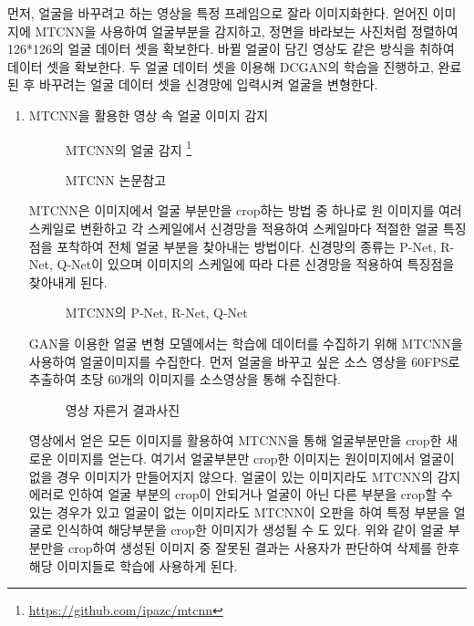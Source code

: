 \documentclass{oblivoir}
\begin{document}
먼저, 얼굴을 바꾸려고 하는 영상을 특정 프레임으로 잘라 이미지화한다. 얻어진 이미지에 MTCNN을 사용하여 얼굴부분을 감지하고,  정면을 바라보는 사진처럼 정렬하여 126*126의 얼굴 데이터 셋을 확보한다. 바뀔 얼굴이 담긴 영상도 같은 방식을 취하여 데이터 셋을 확보한다. 두 얼굴 데이터 셋을 이용해 DCGAN의 학습을 진행하고, 완료된 후 바꾸려는 얼굴 데이터 셋을 신경망에 입력시켜 얼굴을 변형한다.
\begin{enumerate}
    
    \item MTCNN을 활용한 영상 속 얼굴 이미지 감지


    \begin{figure}[h!]
    \centering
    \caption{MTCNN의 얼굴 감지 \protect\footnote{\protect\url {https://github.com/ipazc/mtcnn}}}
    \end{figure}

    \begin{figure}[h!]
    \centering
    \caption{MTCNN 논문참고}
    \end{figure}



    MTCNN은 이미지에서 얼굴 부분만을 crop하는 방법 중 하나로 원 이미지를 여러 스케일로 변환하고 각 스케일에서 신경망을 적용하여 스케일마다 적절한 얼굴 특징점을 포착하여 전체 얼굴 부분을 찾아내는 방법이다. 신경망의 종류는 P-Net, R-Net, Q-Net이 있으며 이미지의 스케일에 따라 다른 신경망을 적용하여 특징점을 찾아내게 된다.

    \begin{figure}[h!]
    \centering
    \caption{MTCNN의 P-Net, R-Net, Q-Net}
    \end{figure}


    GAN을 이용한 얼굴 변형 모델에서는 학습에 데이터를 수집하기 위해 MTCNN을 사용하여 얼굴이미지를 수집한다. 먼저 얼굴을 바꾸고 싶은 소스 영상을 60FPS로 추출하여 초당 60개의 이미지를 소스영상을 통해 수집한다.

    \begin{figure}[h!]%
    \centering
    \caption{영상 자른거 결과사진}
    \end{figure}


    영상에서 얻은 모든 이미지를 활용하여 MTCNN을 통해 얼굴부분만을 crop한 새로운 이미지를 얻는다. 여기서 얼굴부분만 crop한 이미지는 원이미지에서 얼굴이 없을 경우 이미지가 만들어지지 않으다. 얼굴이 있는 이미지라도 MTCNN의 감지 에러로 인하여 얼굴 부분의 crop이 안되거나 얼굴이 아닌 다른 부분을 crop할 수 있는 경우가 있고 얼굴이 없는 이미지라도 MTCNN이 오판을 하여 특정 부분을 얼굴로 인식하여 해당부분을 crop한 이미지가 생성될 수 도 있다. 위와 같이 얼굴 부분만을 crop하여 생성된 이미지 중 잘못된 결과는 사용자가 판단하여 삭제를 한후 해당 이미지들로 학습에 사용하게 된다.


\end{enumerate}
\end{document}
